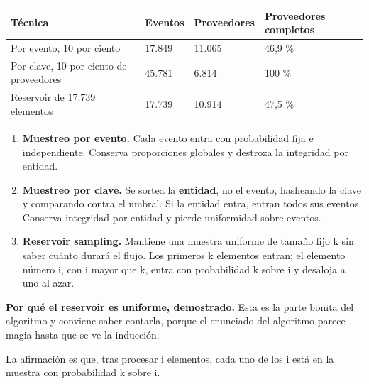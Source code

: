 \documentclass[11pt]{article}
\begin{document}
\begin{center}\footnotesize
\begin{tabularx}{\linewidth}{Q{1.706}Q{0.642}Q{0.733}Q{0.919}}
\toprule
\textbf{Técnica} & \textbf{Eventos} & \textbf{Proveedores} & \textbf{Proveedores completos} \\
\midrule
Por evento, 10 por ciento & 17.849 & 11.065 & 46,9 \% \\
Por clave, 10 por ciento de proveedores & 45.781 & 6.814 & 100 \% \\
Reservoir de 17.739 elementos & 17.739 & 10.914 & 47,5 \% \\
\bottomrule
\end{tabularx}
\end{center}
\begin{enumerate}
  \item \textbf{Muestreo por evento.} Cada evento entra con probabilidad fija e independiente. Conserva proporciones globales y destroza la integridad por entidad.
  \item \textbf{Muestreo por clave.} Se sortea la \textbf{entidad}, no el evento, hasheando la clave y comparando contra el umbral. Si la entidad entra, entran todos sus eventos. Conserva integridad por entidad y pierde uniformidad sobre eventos.
  \item \textbf{Reservoir sampling.} Mantiene una muestra uniforme de tamaño fijo k sin saber cuánto durará el flujo. Los primeros k elementos entran; el elemento número i, con i mayor que k, entra con probabilidad k sobre i y desaloja a uno al azar.
\end{enumerate}
\textbf{Por qué el reservoir es uniforme, demostrado.} Esta es la parte bonita del algoritmo y conviene saber contarla, porque el enunciado del algoritmo parece magia hasta que se ve la inducción.

La afirmación es que, tras procesar i elementos, cada uno de los i está en la muestra con probabilidad k sobre i.
\end{document}
